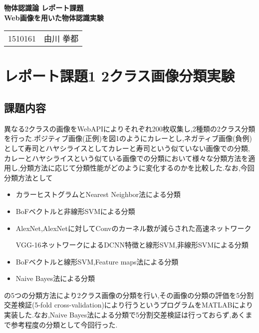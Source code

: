 \documentclass[11pt,a4j]{jreport}
\begin{document}
\thispagestyle{empty}
\begin{center}
\begin{Huge}
{\bf 物体認識論 レポート課題}\\
\vspace{0.5cm}
{\bf Web画像を用いた物体認識実験}\\
\vspace{1.5cm}

\begin{tabular}{cc} 
1510161 & 由川 拳都  
\end{tabular}
\end{Huge}
\end{center}

\newpage

\tableofcontents

\chapter{レポート課題1 2クラス画像分類実験}
\section{課題内容}
異なる2クラスの画像をWebAPIによりそれぞれ200枚収集し,2種類の2クラス分類を行った.ポジティブ画像(正例)を図1のようにカレーとし,ネガティブ画像(負例)として寿司とハヤシライスとしてカレーと寿司という似ていない画像での分類,カレーとハヤシライスという似ている画像での分類において様々な分類方法を適用し,分類方法に応じて分類性能がどのように変化するのかを比較した.なお,今回分類方法として
\begin{itemize}
\item カラーヒストグラムとNearest Neighbor法による分類
\item BoFベクトルと非線形SVMによる分類
\item AlexNet,AlexNetに対してConvのカーネル数が減らされた高速ネットワーク

  VGG-16ネットワークによるDCNN特徴と線形SVM,非線形SVMによる分類
\item BoFベクトルと線形SVM,Feature maps法による分類
\item Naive Bayes法による分類
\end{itemize}
の5つの分類方法により2クラス画像の分類を行い,その画像の分類の評価を5分割交差検証(5-fold cross-validation)により行うというプログラムをMATLABにより実装した.なお,Naive Bayes法による分類で5分割交差検証は行っておらず,あくまで参考程度の分類として今回行った.
\end{document}
